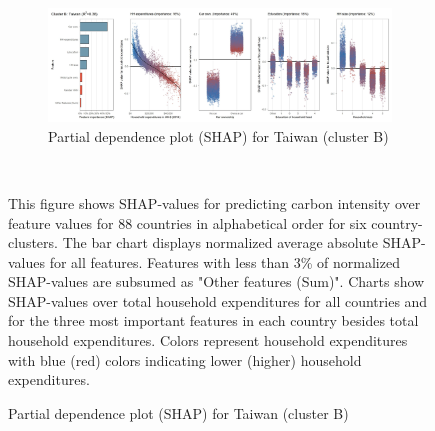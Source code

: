 \begin{figure}[ht!]
    \\
    \vspace{0.5cm}
   \begin{subfigure}[b]{\textwidth}
    \centering
         \caption{Partial dependence plot (SHAP) for Taiwan (cluster B)}
         \label{fig:5b_TWN}
         \includegraphics[width=\textwidth]{Figure 5b/Figure_5b_TWN} 
         \end{subfigure}
    \\
    \vspace{0.5cm}
   
    \begin{subcaption2}
     This figure shows SHAP-values for predicting carbon intensity over feature values for 88 countries in alphabetical order for six country-clusters. The bar chart displays normalized average absolute SHAP-values for all features. Features with less than 3\% of normalized SHAP-values are subsumed as "Other features (Sum)". Charts show SHAP-values over total household expenditures for all countries and for the three most important features in each country besides total household expenditures. Colors represent household expenditures with blue (red) colors indicating lower (higher) household expenditures.
     \end{subcaption2}
\end{figure}


